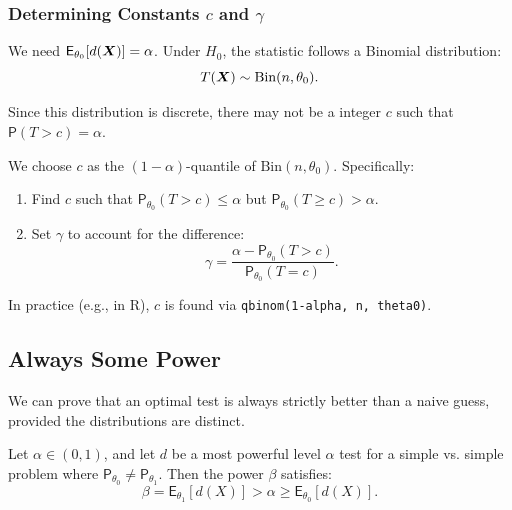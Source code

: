 \begin{ex}
\subsubsection{Determining Constants $c$ and $\gamma$}
We need $\mathsf{E}_{\theta_0}[d(\boldsymbol{X})] = \alpha$. Under $H_0$, the statistic follows a Binomial distribution:
\[ T(\boldsymbol{X}) \sim \text{Bin}(n, \theta_0). \]

Since this distribution is discrete, there may not be a integer $c$ such that $\mathsf{P}(T > c) = \alpha$.


We choose $c$ as the $(1-\alpha)$-quantile of $\text{Bin}(n, \theta_0)$. Specifically:
\begin{enumerate}
    \item Find $c$ such that $\mathsf{P}_{\theta_0}(T > c) \le \alpha$ but $\mathsf{P}_{\theta_0}(T \ge c) > \alpha$.
    \item Set $\gamma$ to account for the difference:
    \[ \gamma = \frac{\alpha - \mathsf{P}_{\theta_0}(T > c)}{\mathsf{P}_{\theta_0}(T = c)}. \]
\end{enumerate}
In practice (e.g., in R), $c$ is found via \texttt{qbinom(1-alpha, n, theta0)}.
\end{ex}

\subsection{Always Some Power}
\label{sec:always_some_power}

We can prove that an optimal test is always strictly better than a naive guess, provided the distributions are distinct.

\begin{corollary}
Let $\alpha \in (0,1)$, and let $d$ be a most powerful level $\alpha$ test for a simple vs. simple problem where $\mathsf{P}_{\theta_0} \neq \mathsf{P}_{\theta_1}$. Then the power $\beta$ satisfies:
\[ \beta = \mathsf{E}_{\theta_1}[d(X)] > \alpha \ge \mathsf{E}_{\theta_0}[d(X)]. \]
\end{corollary}

